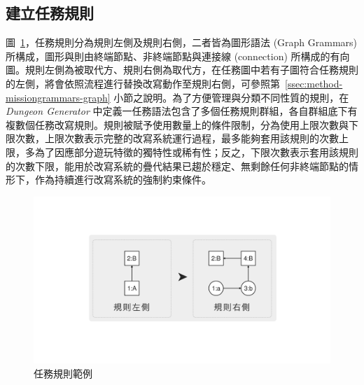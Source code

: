 


\subsection{建立任務規則}
\label{ssec:method-missiongrammars-rules}

圖~\ref{fig:missiongrammars-tutorial}，任務規則分為規則左側及規則右側，二者皆為圖形語法 (Graph Grammars) 所構成，圖形與則由終端節點、非終端節點與連接線 (connection) 所構成的有向圖。規則左側為被取代方、規則右側為取代方，在任務圖中若有子圖符合任務規則的左側，將會依照流程進行替換改寫動作至規則右側，可參照第~\ref{ssec:method-missiongrammars-graph} 小節之說明。為了方便管理與分類不同性質的規則，在 \textit{Dungeon Generator} 中定義一任務語法包含了多個任務規則群組，各自群組底下有複數個任務改寫規則。規則被賦予使用數量上的條件限制，分為使用上限次數與下限次數，上限次數表示完整的改寫系統運行過程，最多能夠套用該規則的次數上限，多為了因應部分遊玩特徵的獨特性或稀有性；反之，下限次數表示套用該規則的次數下限，能用於改寫系統的疊代結果已趨於穩定、無剩餘任何非終端節點的情形下，作為持續進行改寫系統的強制約束條件。

\begin{figure}[!htb]
  \begin{center}
    \includegraphics[width=1.0\textwidth]{figures/missiongrammars-tutorial.pdf}
    \caption{任務規則範例}
    \label{fig:missiongrammars-tutorial}
  \end{center}
\end{figure}

